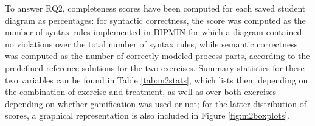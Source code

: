 To answer RQ2, completeness scores have been computed for each saved student diagram as percentages: for syntactic correctness, the score was computed as the number of syntax rules implemented in BIPMIN for which a diagram contained no violations over the total number of syntax rules, while semantic correctness was computed as the number of correctly modeled process parts, according to the predefined reference solutions for the two exercises. Summary statistics for these two variables can be found in Table \ref{tab:m2stats}, which lists them depending on the combination of exercise and treatment, as well as over both exercises depending on whether gamification was used or not; for the latter distribution of scores, a graphical representation is also included in Figure \ref{fig:m2boxplots}.

\begin{table}[ht]
  \centering
  \small
  \caption{Summary statistics for \textit{Correctness} metrics}
  \label{tab:m2stats}
\end{table}

